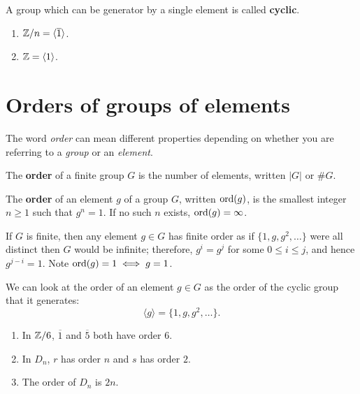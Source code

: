 \begin{definition}[Cyclic]
    A group which can be generator by a single element is called \textbf{cyclic}.
\end{definition}

\begin{example}
    \hfill
    \begin{enumerate}
        \item 
            $\mathbb{Z}/n = \langle \overline 1 \rangle$.

        \item
            $\mathbb{Z} = \langle 1 \rangle$.
    \end{enumerate}
\end{example}

\section{Orders of groups of elements}

The word \emph{order} can mean different properties depending on whether
you are referring to a \emph{group} or an \emph{element}.

\begin{definition}[Order]
    The \textbf{order} of a finite group $G$ is the number of elements,
    written $\lvert G \rvert$ or $\#G$.
\end{definition}

\begin{definition}
    The \textbf{order} of an element $g$ of a group $G$, 
    written $\operatorname{ord}(g)$,
    is the smallest integer $n \geq 1$ such that $g^n = 1$.
    If no such $n$ exists, $\operatorname{ord}(g) = \infty$.
\end{definition}

\begin{remark}
    If $G$ is finite, then any element $g \in G$ has finite order as
    if $\{1, g, g^2, \ldots\}$ were all distinct then $G$ would be infinite;
    therefore, $g^i = g^j$ for some $0 \leq i \leq j$, and hence
    $g^{j - i} = 1$. 
    Note $\operatorname{ord}(g) = 1 \iff g = 1$.
\end{remark}

We can look at the order of an element $g \in G$ as the order of the 
cyclic group that it generates:
\[
    \langle g \rangle = \{1, g, g^2, \ldots\}.
\]

\begin{example}
    \begin{enumerate}
        \item 
            In $\mathbb{Z}/6$, $\overline 1$ and $\overline 5$ both have order $6$.

        \item
            In $D_n$, $r$ has order $n$ and $s$ has order $2$.

        \item 
            The order of $D_n$ is $2n$.
    \end{enumerate}
\end{example}
